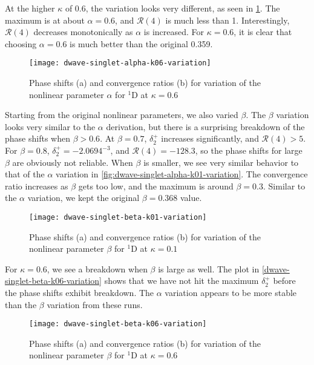 \documentclass[Dissertation.tex]{subfiles}
\begin{document}
At the higher $\kappa$ of 0.6, the variation looks very different, as seen in
\cref{fig:dwave-singlet-alpha-k06-variation}. The maximum is at about
$\alpha = 0.6$, and $\mathcal{R}(4)$ is much less than 1. Interestingly,
$\mathcal{R}(4)$ decreases monotonically as $\alpha$ is increased. For
$\kappa = 0.6$, it is clear that choosing $\alpha = 0.6$ is much better than
the original 0.359.

\begin{figure}[H]
	\centering
	\texttt{[image: dwave-singlet-alpha-k06-variation]}
	\caption[Variation of the nonlinear parameter $\alpha$ for $^{1}$D at $\kappa = 0.6$]{Phase shifts (a) and convergence ratios (b) for variation of the nonlinear parameter $\alpha$ for $^{1}$D at $\kappa = 0.6$}
	\label{fig:dwave-singlet-alpha-k06-variation}
\end{figure}

Starting from the original nonlinear parameters, we also varied $\beta$. The
$\beta$ variation looks very similar to the $\alpha$ derivation, but there is
a surprising breakdown of the phase shifts when $\beta > 0.6$. At $\beta = 0.7$,
$\delta_2^+$ increases significantly, and $\mathcal{R}(4) > 5$. For $\beta = 0.8$,
$\delta_2^+ = -2.0694^{-3}$, and $\mathcal{R}(4) = -128.3$, so the phase shifts
for large $\beta$ are obviously not reliable. When $\beta$ is smaller, we see
very similar behavior to that of the $\alpha$ variation in
\cref{fig:dwave-singlet-alpha-k01-variation}. The convergence ratio increases as
$\beta$ gets too low, and the maximum is around $\beta = 0.3$. Similar to the
$\alpha$ variation, we kept the original $\beta = 0.368$ value.

\begin{figure}[H]
	\centering
	\texttt{[image: dwave-singlet-beta-k01-variation]}
	\caption[Variation of the nonlinear parameter $\beta$ for $^{1}$D at $\kappa = 0.1$]{Phase shifts (a) and convergence ratios (b) for variation of the nonlinear parameter $\beta$ for $^{1}$D at $\kappa = 0.1$}
	\label{fig:dwave-singlet-beta-k01-variation}
\end{figure}

For $\kappa = 0.6$, we see a breakdown when $\beta$ is large as well. The plot
in \cref{dwave-singlet-beta-k06-variation} shows that we have not hit the maximum
$\delta_2^+$ before the phase shifts exhibit breakdown. The $\alpha$ variation
appears to be more stable than the $\beta$ variation from these runs.

\begin{figure}[H]
	\centering
	\texttt{[image: dwave-singlet-beta-k06-variation]}
	\caption[Variation of the nonlinear parameter $\beta$ for $^{1}$D at $\kappa = 0.6$]{Phase shifts (a) and convergence ratios (b) for variation of the nonlinear parameter $\beta$ for $^{1}$D at $\kappa = 0.6$}
	\label{fig:dwave-singlet-beta-k06-variation}
\end{figure}
\end{document}

